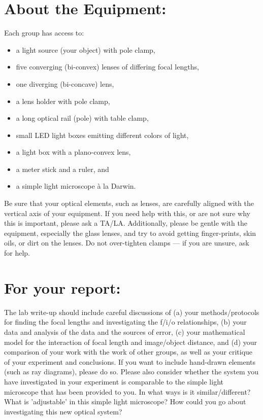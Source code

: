 \section*{About the Equipment:}
Each group has access to:
\begin{itemize}
\item a light source (your object) with pole clamp,
\item five converging (bi-convex) lenses of differing focal lengths,
\item one diverging (bi-concave) lens,
\item a lens holder with pole clamp,
\item a long optical rail (pole) with table clamp,
\item small LED light boxes emitting different colors of light,
\item a light box with a plano-convex lens,
\item a meter stick and a ruler, and
\item a simple light microscope à la Darwin.
\end{itemize}
Be sure that your optical elements, such as lenses, are carefully aligned with the vertical axis of your equipment. 
If you need help with this, or are not sure why this is important, please ask a TA/LA. 
Additionally, please be gentle with the equipment, especially the glass lenses, and try to avoid getting finger-prints, skin oils, or dirt on the lenses. Do not over-tighten clamps — if you are unsure, ask for help.
\par
\section*{For your report:}
The lab write-up should include careful discussions of (a) your methods/protocols for finding the focal lengths and investigating the f/i/o relationships, (b) your data and analysis of the data and the sources of error, (c) your mathematical model for the interaction of focal length and image/object distance, and (d) your comparison of your work with the work of other groups, as well as your critique of your experiment and conclusions. 
If you want to include hand-drawn elements (such as ray diagrams), please do so.
Please also consider whether the system you have investigated in your experiment is comparable to the simple light microscope that has been provided to you. 
In what ways is it similar/different?
What is 'adjustable' in this simple light microscope?
How could you go about investigating this new optical system?